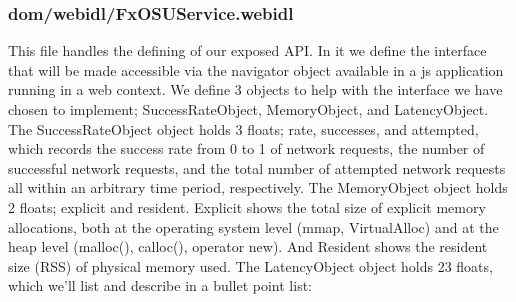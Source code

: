 \documentclass[12pt]{article}
\begin{document}
\subsubsection{dom/webidl/FxOSUService.webidl}
This file handles the defining of our exposed API. In it we define the interface that will be made accessible via the navigator object available in a js application running in a web context. We define 3 objects to help with the interface we have chosen to implement; SuccessRateObject, MemoryObject, and LatencyObject. The SuccessRateObject object holds 3 floats; rate, successes, and attempted, which records the success rate from 0 to 1 of network requests, the number of successful network requests, and the total number of attempted network requests all within an arbitrary time period, respectively. The MemoryObject object holds 2 floats; explicit and resident. Explicit shows the total size of explicit memory allocations, both at the operating system level (mmap, VirtualAlloc) and at the heap level (malloc(), calloc(), operator new). And Resident shows the resident size (RSS) of physical memory used. The LatencyObject object holds 23 floats, which we'll list and describe in a bullet point list:
\end{document}
